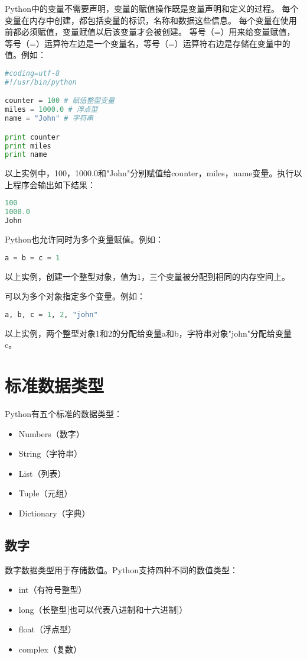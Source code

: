 Python中的变量不需要声明，变量的赋值操作既是变量声明和定义的过程。
每个变量在内存中创建，都包括变量的标识，名称和数据这些信息。
每个变量在使用前都必须赋值，变量赋值以后该变量才会被创建。
等号（=）用来给变量赋值，等号（=）运算符左边是一个变量名，等号（=）运算符右边是存储在变量中的值。例如：
\begin{lstlisting}[language=Python]
#coding=utf-8
#!/usr/bin/python

counter = 100 # 赋值整型变量
miles = 1000.0 # 浮点型
name = "John" # 字符串

print counter
print miles
print name
\end{lstlisting}
以上实例中，100，1000.0和"John"分别赋值给counter，miles，name变量。执行以上程序会输出如下结果：
\begin{lstlisting}[language=Python]
100
1000.0
John
\end{lstlisting}

Python也允许同时为多个变量赋值。例如：
\begin{lstlisting}[language=Python]
a = b = c = 1
\end{lstlisting}
以上实例，创建一个整型对象，值为1，三个变量被分配到相同的内存空间上。

可以为多个对象指定多个变量。例如：
\begin{lstlisting}[language=Python]
a, b, c = 1, 2, "john"
\end{lstlisting}
以上实例，两个整型对象1和2的分配给变量a和b，字符串对象"john"分配给变量c。



\section{标准数据类型}
Python有五个标准的数据类型：
\begin{itemize}
\item Numbers（数字）
\item String（字符串）
\item List（列表）
\item Tuple（元组）
\item Dictionary（字典）
\end{itemize}


\subsection{数字}
数字数据类型用于存储数值。Python支持四种不同的数值类型：
\begin{itemize}
\item int（有符号整型）
\item long（长整型[也可以代表八进制和十六进制]）
\item float（浮点型）
\item complex（复数）
\end{itemize}

